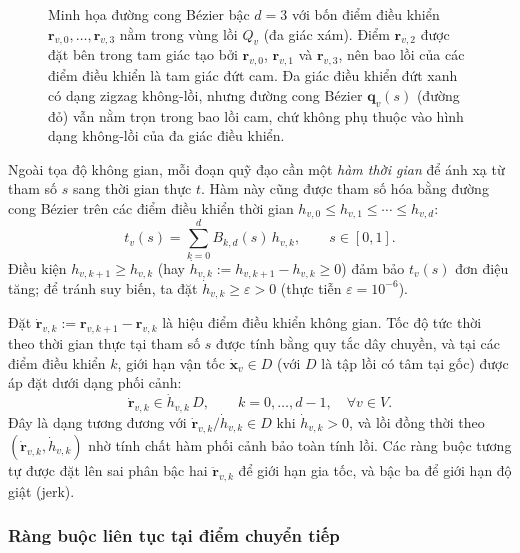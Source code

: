 \begin{figure}[htbp]
\begin{tikzpicture}[scale=1.0]
    \end{tikzpicture}
    \caption[Đường cong Bézier nằm trong bao lồi của các điểm điều khiển]{%
        Minh họa đường cong Bézier bậc $d=3$ với bốn điểm điều khiển
        $\mathbf{r}_{v,0},\ldots,\mathbf{r}_{v,3}$ nằm trong vùng lồi $Q_v$
        (đa giác xám). Điểm $\mathbf{r}_{v,2}$ được đặt bên trong tam giác
        tạo bởi $\mathbf{r}_{v,0}$, $\mathbf{r}_{v,1}$ và $\mathbf{r}_{v,3}$,
        nên bao lồi của các điểm điều khiển là tam giác đứt cam. Đa giác điều
        khiển đứt xanh có dạng zigzag không-lồi, nhưng đường cong Bézier
        $\mathbf{q}_v(s)$ (đường đỏ) vẫn nằm trọn trong bao lồi cam, chứ không
        phụ thuộc vào hình dạng không-lồi của đa giác điều khiển.}
    \label{fig:bezier_convex_hull}
\end{figure}

Ngoài tọa độ không gian, mỗi đoạn quỹ đạo cần một \emph{hàm thời gian} để ánh
xạ từ tham số $s$ sang thời gian thực $t$. Hàm này cũng được tham số hóa bằng
đường cong Bézier trên các điểm điều khiển thời gian $h_{v,0} \le h_{v,1} \le
    \cdots \le h_{v,d}$:
\begin{equation}
    t_v(s)
    = \sum_{k=0}^{d} B_{k,d}(s)\, h_{v,k},
    \qquad s \in [0,1].
    \label{eq:time_bezier}
\end{equation}
Điều kiện $h_{v,k+1} \ge h_{v,k}$ (hay $\dot{h}_{v,k} := h_{v,k+1} - h_{v,k}
    \ge 0$) đảm bảo $t_v(s)$ đơn điệu tăng; để tránh suy biến, ta đặt
$\dot{h}_{v,k} \ge \varepsilon > 0$ (thực tiễn $\varepsilon = 10^{-6}$).

Đặt $\dot{\mathbf{r}}_{v,k} := \mathbf{r}_{v,k+1} - \mathbf{r}_{v,k}$ là hiệu
điểm điều khiển không gian. Tốc độ tức thời theo thời gian thực tại tham số $s$
được tính bằng quy tắc dây chuyền, và tại các điểm điều khiển $k$, giới hạn vận
tốc $\dot{\mathbf{x}}_v \in D$ (với $D$ là tập lồi có tâm tại gốc) được áp đặt
dưới dạng phối cảnh:
\begin{equation}
    \dot{\mathbf{r}}_{v,k} \in \dot{h}_{v,k}\, D,
    \qquad k = 0, \ldots, d-1,\quad \forall v \in V.
    \label{eq:vel_perspective}
\end{equation}
Đây là dạng tương đương với $\dot{\mathbf{r}}_{v,k}/\dot{h}_{v,k} \in D$ khi
$\dot{h}_{v,k} > 0$, và lồi đồng thời theo $(\dot{\mathbf{r}}_{v,k},
    \dot{h}_{v,k})$ nhờ tính chất hàm phối cảnh bảo toàn tính lồi.
Các ràng buộc tương tự được đặt lên sai phân bậc hai $\ddot{\mathbf{r}}_{v,k}$
để giới hạn gia tốc, và bậc ba để giới hạn độ giật (jerk).

\subsubsection{Ràng buộc liên tục tại điểm chuyển tiếp}
\label{subsubsec:continuity}

